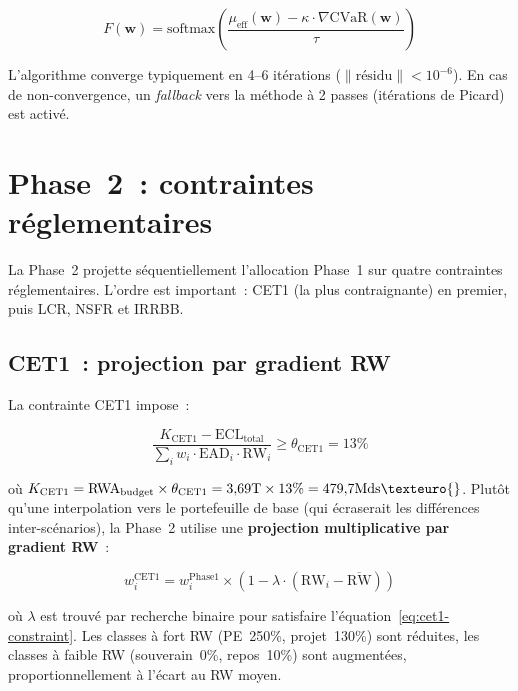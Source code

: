\documentclass[12pt, a4paper, twoside, openright]{report}
\theoremstyle{definition}
\begin{document}
\begin{equation}
F(\mathbf{w}) = \text{softmax}\!\left(\frac{\mu_{\text{eff}}(\mathbf{w}) - \kappa \cdot \nabla \text{CVaR}(\mathbf{w})}{\tau}\right)
\label{eq:anderson}
\end{equation}

L'algorithme converge typiquement en 4--6 itérations ($\|\text{résidu}\| < 10^{-6}$). En cas de non-convergence, un \textit{fallback} vers la méthode à 2 passes (itérations de Picard) est activé.


\section{Phase~2~: contraintes réglementaires}
\label{sec:blcvar-phase2}

La Phase~2 projette séquentiellement l'allocation Phase~1 sur quatre contraintes réglementaires. L'ordre est important~: CET1 (la plus contraignante) en premier, puis LCR, NSFR et IRRBB.

\subsection{CET1~: projection par gradient RW}
\label{sec:cet1-proj}

La contrainte CET1 impose~:

\begin{equation}
\frac{K_{\text{CET1}} - \text{ECL}_{\text{total}}}{\sum_i w_i \cdot \text{EAD}_i \cdot \text{RW}_i} \geq \theta_{\text{CET1}} = 13\%
\label{eq:cet1-constraint}
\end{equation}

\noindent où $K_{\text{CET1}} = \text{RWA}_{\text{budget}} \times \theta_{\text{CET1}} = 3{,}69\text{T} \times 13\% = 479{,}7\text{Mds}\texteuro{}$. Plutôt qu'une interpolation vers le portefeuille de base (qui écraserait les différences inter-scénarios), la Phase~2 utilise une \textbf{projection multiplicative par gradient RW}~:

\begin{equation}
w_i^{\text{CET1}} = w_i^{\text{Phase1}} \times \left(1 - \lambda \cdot (\text{RW}_i - \overline{\text{RW}})\right)
\label{eq:cet1-gradient}
\end{equation}

\noindent où $\lambda$ est trouvé par recherche binaire pour satisfaire l'équation~\ref{eq:cet1-constraint}. Les classes à fort RW (PE~250\%, projet~130\%) sont réduites, les classes à faible RW (souverain~0\%, repos~10\%) sont augmentées, proportionnellement à l'écart au RW moyen.
\end{document}
